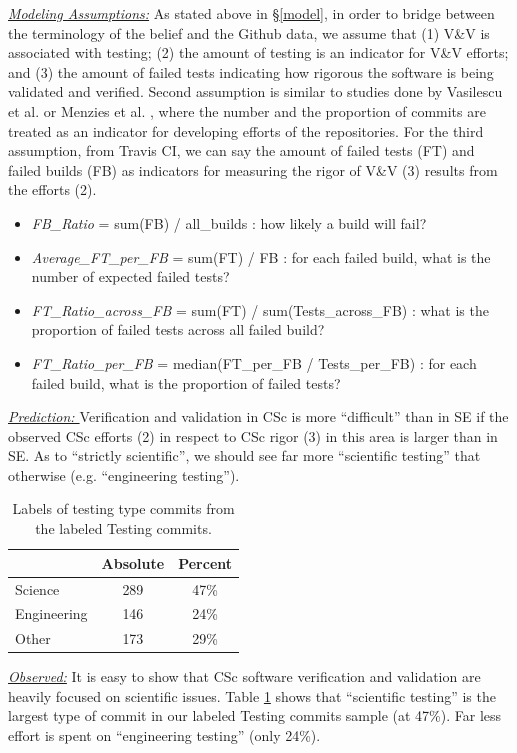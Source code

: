 \documentclass[conference,10pt]{IEEEtran}
\newcommand{\bi}{\begin{itemize}}
\newcommand{\ei}{\end{itemize}}
\begin{document}
\noindent\textit{\underline{Modeling Assumptions:}} 
As stated above in \S\ref{model},
in order to bridge between the terminology of the belief and the Github data, we assume that (1) V\&V is associated with testing; (2) the amount of testing is an indicator for V\&V efforts; and (3) the amount of failed tests indicating how rigorous the software is being validated and verified. Second assumption is similar to studies done by Vasilescu et al. \cite{vasilescu16_limit} or Menzies et al. \cite{xia2019sequential}, where the number and the proportion of commits are treated as an indicator for developing efforts of the repositories. For the third assumption, from Travis CI, we can say the amount of failed tests (FT) and failed builds (FB) as indicators for measuring the rigor of V\&V (3) results from the efforts (2).  

\bi
 \item  \textit{FB\_Ratio} = sum(FB) / all\_builds : how likely a build will fail? 
 \item  \textit{Average\_FT\_per\_FB} = sum(FT) / FB : for each failed build, what is the number of expected failed tests? 
 \item  \textit{FT\_Ratio\_across\_FB} = sum(FT) / sum(Tests\_across\_FB) : what is the proportion of failed tests across all failed build? 
 \item  \textit{FT\_Ratio\_per\_FB} = median(FT\_per\_FB / Tests\_per\_FB) : for each failed build, what is the proportion of failed tests?
\ei

\noindent \textit{\underline{Prediction: }}
Verification and validation in CSc is more
``difficult'' than in SE if the observed CSc efforts (2) in respect to CSc rigor (3) in this area
is larger than in SE. As to ``strictly scientific'', we should see far more ``scientific
testing'' that otherwise (e.g. ``engineering testing''). 


\begin{table}
\vspace{-15pt}
\caption{Labels of testing type commits from the labeled Testing commits.}\label{tbl:testing}
\footnotesize \begin{tabular}{l|c|c}
\multicolumn{1}{c|}{} & \multicolumn{1}{c|}{Absolute} & \multicolumn{1}{c}{Percent}\\
\hline
Science & 289 & 47\% \\
Engineering & 146 & 24\% \\
Other & 173 & 29\% 
\end{tabular}
\end{table}\noindent \textit{\underline{Observed:}}
It is easy to show that CSc software verification and validation are heavily focused on scientific issues.
Table \ref{tbl:testing} shows that ``scientific testing'' is the largest type of commit in our labeled Testing commits sample (at 47\%). 
Far less effort is spent on ``engineering testing'' (only 24\%). 
\end{document}
